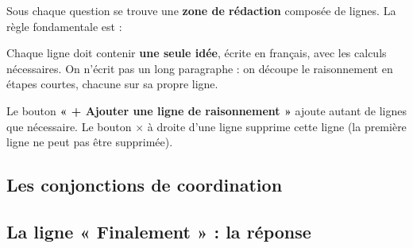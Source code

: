 \documentclass[11pt,a4paper]{article}
\begin{document}
Sous chaque question se trouve une \textbf{zone de rédaction} composée de
lignes. La règle fondamentale est :

\begin{retenir}[Une idée = une ligne]
Chaque ligne doit contenir \textbf{une seule idée}, écrite en français, avec
les calculs nécessaires. On n'écrit pas un long paragraphe : on découpe le
raisonnement en étapes courtes, chacune sur sa propre ligne.
\end{retenir}

Le bouton \textbf{« + Ajouter une ligne de raisonnement »} ajoute autant de
lignes que nécessaire. Le bouton \textbf{\(\times\)} à droite d'une ligne
supprime cette ligne (la première ligne ne peut pas être supprimée).

\subsection{Les conjonctions de coordination}

\begin{center}
\end{center}

\subsection{La ligne « Finalement » : la réponse}
\end{document}
